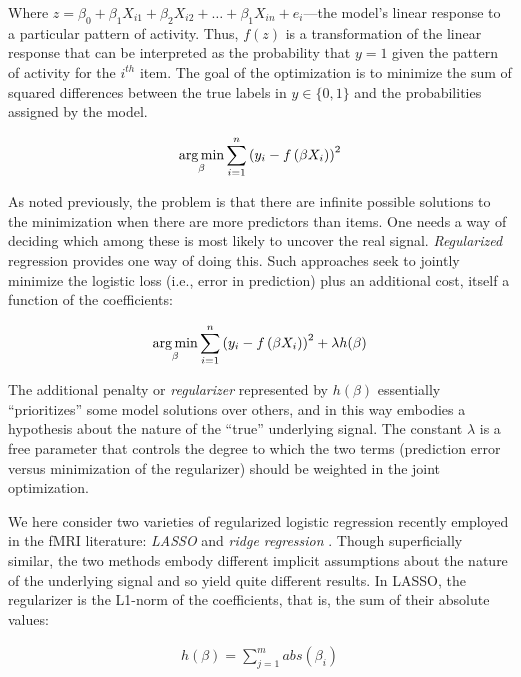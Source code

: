 Where $z = \beta_0 + \beta_1X_{i 1} + \beta_2X_{i 2} + \dots +  \beta_1X_{i n} + e_{i}$---the model's linear response to a particular pattern of activity. Thus, $f(z)$ is a transformation of the linear response that can be interpreted as the probability that $y=1$ given the pattern of activity for the $i^{th}$ item. 
The goal of the optimization is to minimize the sum of squared differences between the true labels in $y \in{\{0,1\}}$ and the probabilities assigned by the model.

\begin{align}
\operatorname*{arg\,min}_\beta \sum^{n}_{i=1}{\left(y_i-f\left( \beta X_i\right) \right)^2}
\label{eq.logisticopt}
\end{align}

As noted previously, the problem is that there are infinite possible solutions to the minimization when there are more predictors than items. One needs a way of deciding which among these is most likely to uncover the real signal. {\em Regularized} regression provides one way of doing this. Such approaches seek to jointly minimize the logistic loss (i.e., error in prediction) plus an additional cost, itself a function of the coefficients:

\begin{align}
\operatorname*{arg\,min}_\beta \sum^{n}_{i=1}{\left( y_i-f\left( \beta X_i\right) \right) ^2} + \lambda h(\beta)
\label{eq.regularized}
\end{align}

The additional penalty or {\em regularizer} represented by $h(\beta)$ essentially ``prioritizes'' some model solutions over others, and in this way embodies a hypothesis about the nature of the ``true'' underlying signal. The constant $\lambda$ is a free parameter that controls the degree to which the two terms (prediction error versus minimization of the regularizer) should be weighted in the joint optimization.

We here consider two varieties of regularized logistic regression recently employed in the fMRI literature: {\em LASSO} and {\em ridge regression} \cite{riggall_relationship_2012,rish_sparse_2012}. Though superficially similar, the two methods embody different implicit assumptions about the nature of the underlying signal and so yield quite different results. In LASSO, the regularizer is the L1-norm of the coefficients, that is, the sum of their absolute values:

\begin{align}
h(\beta) = \sum^m_{j=1} abs(\beta_i)
\label{eq.lasso}
\end{align}

